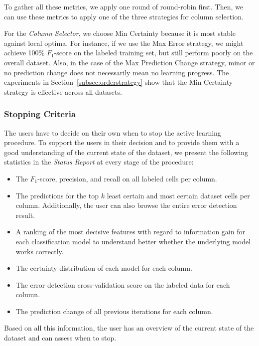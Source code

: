 To gather all these metrics, we apply one round of round-robin first. Then, we can use these metrics to apply one of the three strategies for column selection.

For the \emph{Column Selector}, we choose Min Certainty because it is most stable against local optima. For instance, if we use the Max Error strategy, we might achieve 100\% $F_{1}$-score on the labeled training set, but still perform poorly on the overall dataset. Also, in the case of the Max Prediction Change strategy, minor or no prediction change does not necessarily mean no learning progress. 
The experiments in Section~\ref{subsec:orderstrategy} show that the Min Certainty strategy is effective across all datasets.

\subsubsection{Stopping Criteria}
\label{sec:stopAL}

The users have to decide on their own when to stop the active learning procedure. To support the users in their decision and to provide them with a good understanding of the current state of the dataset, we present the following statistics in the \emph{Status Report} at every stage of the procedure:

\begin{itemize}
  \item The $F_{1}$-score, precision, and recall on all labeled cells per column.
  \item The predictions for the top $k$ least certain and most certain dataset cells per column. Additionally, the user can also browse the entire error detection result.
  \item A ranking of the most decisive features with regard to information gain for each classification model to understand better whether the underlying model works correctly.
  \item The certainty distribution of each model for each column.
  \item The error detection cross-validation score on the labeled data for each column.
  \item The prediction change of all previous iterations for each column.
\end{itemize}

Based on all this information, the user has an overview of the current state of the dataset and can assess when to stop.






